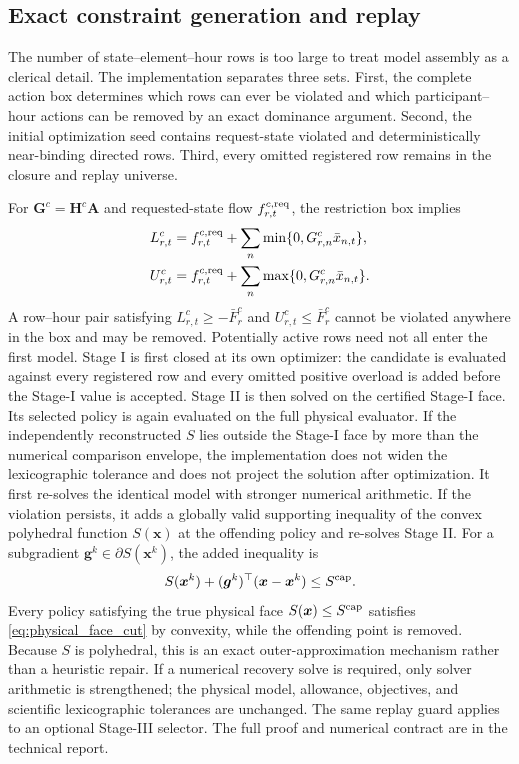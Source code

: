 \documentclass[10pt,journal]{IEEEtran}
\begin{document}
\subsection{Exact constraint generation and replay}

The number of state--element--hour rows is too large to treat model assembly as a clerical detail. The implementation separates three sets. First, the complete action box determines which rows can ever be violated and which participant--hour actions can be removed by an exact dominance argument. Second, the initial optimization seed contains request-state violated and deterministically near-binding directed rows. Third, every omitted registered row remains in the closure and replay universe.

For $\bm G^c=\bm H^c\bm A$ and requested-state flow $f_{r,t}^{c,\rm req}$, the restriction box implies
\begin{align}
L_{r,t}^{c}
&=f_{r,t}^{c,\rm req}
+\sum_n\min\{0,G_{r,n}^c\bar x_{n,t}\},
\notag\\
U_{r,t}^{c}
&=f_{r,t}^{c,\rm req}
+\sum_n\max\{0,G_{r,n}^c\bar x_{n,t}\}.
\label{eq:screen_bounds}
\end{align}
A row--hour pair satisfying $L_{r,t}^{c}\geq-\bar F_r^c$ and $U_{r,t}^{c}\leq\bar F_r^c$ cannot be violated anywhere in the box and may be removed. Potentially active rows need not all enter the first model. Stage I is first closed at its own optimizer: the candidate is evaluated against every registered row and every omitted positive overload is added before the Stage-I value is accepted. Stage II is then solved on the certified Stage-I face. Its selected policy is again evaluated on the full physical evaluator. If the independently reconstructed $S$ lies outside the Stage-I face by more than the numerical comparison envelope, the implementation does not widen the lexicographic tolerance and does not project the solution after optimization. It first re-solves the identical model with stronger numerical arithmetic. If the violation persists, it adds a globally valid supporting inequality of the convex polyhedral function $S(\bm x)$ at the offending policy and re-solves Stage II. For a subgradient $\bm g^k\in\partial S(\bm x^k)$, the added inequality is
\begin{equation}
S(\bm x^k)+(\bm g^k)^\top(\bm x-\bm x^k)\leq S^{\rm cap}.
\label{eq:physical_face_cut}
\end{equation}
Every policy satisfying the true physical face $S(\bm x)\leq S^{\rm cap}$ satisfies \eqref{eq:physical_face_cut} by convexity, while the offending point is removed. Because $S$ is polyhedral, this is an exact outer-approximation mechanism rather than a heuristic repair. If a numerical recovery solve is required, only solver arithmetic is strengthened; the physical model, allowance, objectives, and scientific lexicographic tolerances are unchanged. The same replay guard applies to an optional Stage-III selector. The full proof and numerical contract are in the technical report.
\end{document}
